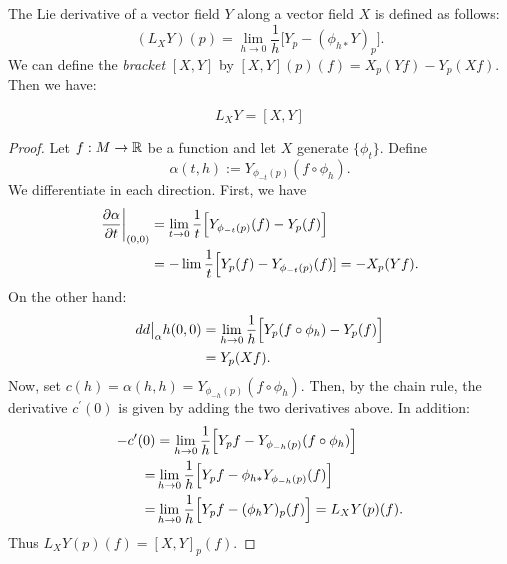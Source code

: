 \documentclass[11pt, english]{article}
\begin{document}
The Lie derivative of a vector field $Y$ along a vector field $X$ is defined as follows:
\[
(L_X Y)(p) = \lim_{h \to 0} \frac 1h \bigl[ Y_p - (\phi_{h \ast} Y)_p \bigr].
\]
We can define the \emph{bracket} $[X,Y]$ by $[X,Y](p)(f)=X_p(Yf)-Y_p(Xf)$. Then we have:
\begin{prop}
\[L_X Y = [X,Y]\]
\end{prop}
\begin{proof}
Let $f:M \to \mathbb{R}$ be a function and let $X$ generate $\{ \phi_t \}$. Define
\[
\alpha (t,h) := Y_{\phi_{-t}(p)}(f \circ \phi_h).
\]
We differentiate in each direction. First, we have
\begin{align*}
\restr{\dd{\alpha}{t}}{(0,0)} &= \lim_{t \to 0} \frac 1t \Bigl[ Y_{\phi_{-t}(p)}(f)-Y_p(f) \Bigr] \\
&= -\lim \frac 1t \Bigl [ Y_p(f) - Y_{\phi_{-t}(p)}(f)] = -X_p(Yf).
\end{align*}
On the other hand:
\begin{align*}
\restr{dd}{\alpha}{h}{(0,0)} &= \lim_{h \to 0} \frac 1h \Bigl[ Y_p(f \circ \phi_h) - Y_p(f) \Bigr] \\
&= Y_p(Xf). 
\end{align*}
Now, set $c(h)= \alpha(h,h)=Y_{\phi_{-h}(p)}(f \circ \phi_h)$. Then, by the chain rule, the derivative $c^\prime(0)$ is given by adding the two derivatives above. In addition:
\begin{align*}
-c^\prime(0) &= \lim_{h \to 0} \frac 1h \Bigl[Y_pf -  Y_{\phi_{-h}(p)}(f \circ \phi_h)\Bigr] \\
=& \lim_{h \to 0} \frac 1h \Bigl [Y_pf -\phi_{h \ast}Y_{\phi_{-h}(p)}(f)\Bigr] \\
=& \lim_{h \to 0} \frac 1h \Bigl [Y_pf -(\phi_hY)_p(f)\Bigr]=L_XY(p)(f).
\end{align*}
Thus $L_XY(p)(f) = [X,Y]_p(f)$.
\end{proof}
\end{document}

